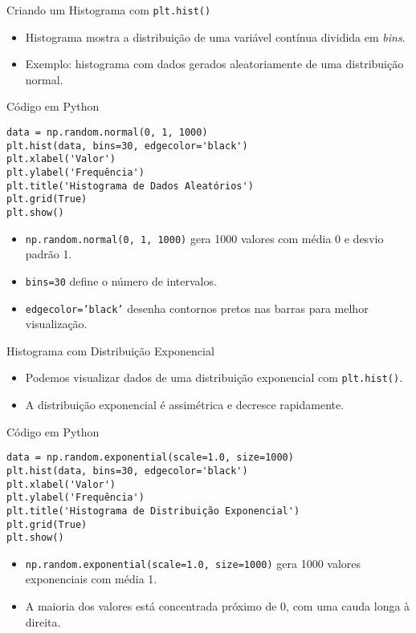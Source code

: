 \begin{frame}[fragile]{Criando um Histograma com \texttt{plt.hist()}}
    \begin{itemize}
        \item Histograma mostra a distribuição de uma variável contínua dividida em \textit{bins}.
        \item Exemplo: histograma com dados gerados aleatoriamente de uma distribuição normal.
    \end{itemize}

    \begin{block}{Código em Python}
\begin{verbatim}
data = np.random.normal(0, 1, 1000)
plt.hist(data, bins=30, edgecolor='black')
plt.xlabel('Valor')
plt.ylabel('Frequência')
plt.title('Histograma de Dados Aleatórios')
plt.grid(True)
plt.show()
\end{verbatim}
    \end{block}

    \begin{itemize}
        \item \texttt{np.random.normal(0, 1, 1000)} gera 1000 valores com média 0 e desvio padrão 1.
        \item \texttt{bins=30} define o número de intervalos.
        \item \texttt{edgecolor='black'} desenha contornos pretos nas barras para melhor visualização.
    \end{itemize}
\end{frame}

\begin{frame}[fragile]{Histograma com Distribuição Exponencial}
    \begin{itemize}
        \item Podemos visualizar dados de uma distribuição exponencial com \texttt{plt.hist()}.
        \item A distribuição exponencial é assimétrica e decresce rapidamente.
    \end{itemize}

    \begin{block}{Código em Python}
\begin{verbatim}
data = np.random.exponential(scale=1.0, size=1000)
plt.hist(data, bins=30, edgecolor='black')
plt.xlabel('Valor')
plt.ylabel('Frequência')
plt.title('Histograma de Distribuição Exponencial')
plt.grid(True)
plt.show()
\end{verbatim}
    \end{block}

    \begin{itemize}
        \item \texttt{np.random.exponential(scale=1.0, size=1000)} gera 1000 valores exponenciais com média 1.
        \item A maioria dos valores está concentrada próximo de 0, com uma cauda longa à direita.
    \end{itemize}
\end{frame}

